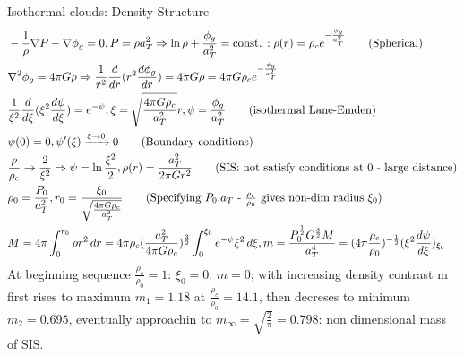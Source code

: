 \begin{frame}{Isothermal clouds: Density Structure}
    \begin{align*}
        &-\frac{1}{\rho}\nabla P-\nabla\phi_g=0, P=\rho a_T^2\Rightarrow \ln{\rho}+\frac{\phi_g}{a_T^2}=\const{}: \rho(r)=\rho_c\exp{-\frac{\phi_g}{a_T^2}}\tag{Spherical}\\
        &\nabla^2\phi_g=4\pi G\rho\Rightarrow \frac{1}{r^2}\TDof{r}(r^2\TDy{r}{\phi_g})=4\pi G\rho=4\pi G\rho_c\exp{-\frac{\phi_g}{a_T^2}}\\
        &\frac{1}{\xi^2}\TDof{\xi}(\xi^2\TDy{\xi}{\psi})=\exp{-\psi},\xi=\sqrt{\frac{4\pi G\rho_c}{a_T^2}}r,\psi=\frac{\phi_g}{a_T^2}\tag{isothermal Lane-Emden}\\
        &\psi(0)=0,\psi'(\xi)\xrightarrow{\xi\to0}0\tag{Boundary conditions}\\
        &\frac{\rho}{\rho_c}\to\frac{2}{\xi^2}\Rightarrow\psi=\ln{\frac{\xi^2}{2}}, \rho(r)=\frac{a_T^2}{2\pi Gr^2}\tag{SIS: not satisfy conditions at 0 - large distance}\\
        &\rho_0=\frac{P_0}{a_T^2},r_0=\frac{\xi_0}{\sqrt{\frac{4\pi G\rho_c}{a_T^2}}}\tag{Specifying $P_0$,$a_T$ - $\frac{\rho_c}{\rho_0}$ gives non-dim radius $\xi_0$}\\
        &M=4\pi\int_0^{r_0}\rho r^2\,dr=4\pi\rho_c(\frac{a_T^2}{4\pi G\rho_c})^{\frac{3}{2}}\int_0^{\xi_0}\exp{-\psi}\xi^2\,d\xi,m=\frac{P_0^{\frac{1}{2}}G^{\frac{3}{2}}M}{a_T^4}=(4\pi \frac{\rho_c}{\rho_0})^{-\frac{1}{2}}(\xi^2\TDy{\xi}{\psi})_{\xi_0}
        \end{align*}
        At beginning sequence $\frac{\rho_c}{\rho_0}=1$: $\xi_0=0$, $m=0$; with increasing density contrast m first rises to maximum $m_1=1.18$ at $\frac{\rho_c}{\rho_0}=14.1$, then decreses to minimum $m_2=0.695$, eventually approachin to $m_{\infty}=\sqrt{\frac{2}{\pi}}=0.798$: non dimensional mass of SIS.
    \end{frame}

